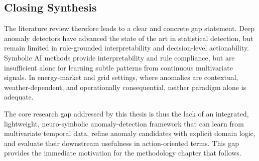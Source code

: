 \subsection{Closing Synthesis}

The literature review therefore leads to a clear and concrete gap statement. Deep anomaly detectors have advanced the state of the art in statistical detection, but remain limited in rule-grounded interpretability and decision-level actionability. Symbolic AI methods provide interpretability and rule compliance, but are insufficient alone for learning subtle patterns from continuous multivariate signals. In energy-market and grid settings, where anomalies are contextual, weather-dependent, and operationally consequential, neither paradigm alone is adequate.

The core research gap addressed by this thesis is thus the lack of an integrated, lightweight, neuro-symbolic anomaly-detection framework that can learn from multivariate temporal data, refine anomaly candidates with explicit domain logic, and evaluate their downstream usefulness in action-oriented terms. This gap provides the immediate motivation for the methodology chapter that follows.



